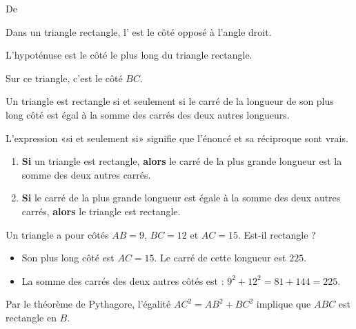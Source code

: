 

De \cite{NRHooXFvgpp4}

\begin{definition}
    Dans un triangle rectangle, l' est le côté opposé à l'angle droit.
\end{definition}
\begin{remark}
    L'hypoténuse est le côté le plus long du triangle rectangle.
\end{remark}

\begin{example}
    Sur ce triangle, c'est le côté \( BC\).
    \begin{center}
        
    \end{center}
\end{example}

\begin{theorem}[de Pythagore]
    Un triangle est rectangle si et seulement si le carré de la longueur de son plus long côté est égal à la somme des carrés des deux autres longueurs.
\end{theorem}

\begin{remark}
    L'expression «si et seulement si» signifie que l'énoncé et sa réciproque sont vrais.
    \begin{enumerate}
        \item
            {\bf Si} un triangle est rectangle, {\bf alors} le carré de la plus grande longueur est la somme des deux autres carrés.
        \item
            {\bf Si} le carré de la plus grande longueur est égale à la somme des deux autres carrés, {\bf alors} le triangle est rectangle.
    \end{enumerate}
\end{remark}

\begin{example}
    Un triangle a pour côtés \( AB=9\), \( BC=12\) et \( AC=15\). Est-il rectangle ?
    \begin{itemize}
        \item Son plus long côté est \( AC=15\). Le carré de cette longueur est \( 225\).
        \item La somme des carrés des deux autres côtés est : \( 9^2+12^2=81+144=225\).
    \end{itemize}
    Par le théorème de Pythagore, l'égalité \( AC^2=AB^2+BC^2\) implique que \( ABC\) est rectangle en \( B\).
\end{example}

